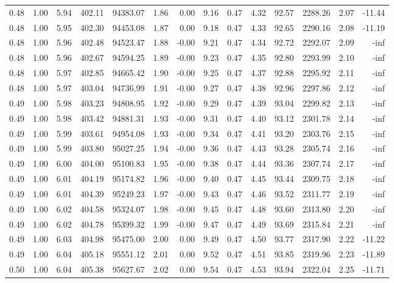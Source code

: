 \begin{table}[!ht]
\begin{tabular}{rrrrrrrrrrrrrr}
0.48 & 1.00 & 5.94 & 402.11 & 94383.07 & 1.86 & 0.00 & 9.16 & 0.47 & 4.32 & 92.57 & 2288.26 & 2.07 & -11.44 \\
0.48 & 1.00 & 5.95 & 402.30 & 94453.08 & 1.87 & 0.00 & 9.18 & 0.47 & 4.33 & 92.65 & 2290.16 & 2.08 & -11.19 \\
0.48 & 1.00 & 5.96 & 402.48 & 94523.47 & 1.88 & -0.00 & 9.21 & 0.47 & 4.34 & 92.72 & 2292.07 & 2.09 & -inf \\
0.48 & 1.00 & 5.96 & 402.67 & 94594.25 & 1.89 & -0.00 & 9.23 & 0.47 & 4.35 & 92.80 & 2293.99 & 2.10 & -inf \\
0.48 & 1.00 & 5.97 & 402.85 & 94665.42 & 1.90 & -0.00 & 9.25 & 0.47 & 4.37 & 92.88 & 2295.92 & 2.11 & -inf \\
0.48 & 1.00 & 5.97 & 403.04 & 94736.99 & 1.91 & -0.00 & 9.27 & 0.47 & 4.38 & 92.96 & 2297.86 & 2.12 & -inf \\
0.49 & 1.00 & 5.98 & 403.23 & 94808.95 & 1.92 & -0.00 & 9.29 & 0.47 & 4.39 & 93.04 & 2299.82 & 2.13 & -inf \\
0.49 & 1.00 & 5.98 & 403.42 & 94881.31 & 1.93 & -0.00 & 9.31 & 0.47 & 4.40 & 93.12 & 2301.78 & 2.14 & -inf \\
0.49 & 1.00 & 5.99 & 403.61 & 94954.08 & 1.93 & -0.00 & 9.34 & 0.47 & 4.41 & 93.20 & 2303.76 & 2.15 & -inf \\
0.49 & 1.00 & 5.99 & 403.80 & 95027.25 & 1.94 & -0.00 & 9.36 & 0.47 & 4.43 & 93.28 & 2305.74 & 2.16 & -inf \\
0.49 & 1.00 & 6.00 & 404.00 & 95100.83 & 1.95 & -0.00 & 9.38 & 0.47 & 4.44 & 93.36 & 2307.74 & 2.17 & -inf \\
0.49 & 1.00 & 6.01 & 404.19 & 95174.82 & 1.96 & -0.00 & 9.40 & 0.47 & 4.45 & 93.44 & 2309.75 & 2.18 & -inf \\
0.49 & 1.00 & 6.01 & 404.39 & 95249.23 & 1.97 & -0.00 & 9.43 & 0.47 & 4.46 & 93.52 & 2311.77 & 2.19 & -inf \\
0.49 & 1.00 & 6.02 & 404.58 & 95324.07 & 1.98 & -0.00 & 9.45 & 0.47 & 4.48 & 93.60 & 2313.80 & 2.20 & -inf \\
0.49 & 1.00 & 6.02 & 404.78 & 95399.32 & 1.99 & -0.00 & 9.47 & 0.47 & 4.49 & 93.69 & 2315.84 & 2.21 & -inf \\
0.49 & 1.00 & 6.03 & 404.98 & 95475.00 & 2.00 & 0.00 & 9.49 & 0.47 & 4.50 & 93.77 & 2317.90 & 2.22 & -11.22 \\
0.49 & 1.00 & 6.04 & 405.18 & 95551.12 & 2.01 & 0.00 & 9.52 & 0.47 & 4.51 & 93.85 & 2319.96 & 2.23 & -11.89 \\
0.50 & 1.00 & 6.04 & 405.38 & 95627.67 & 2.02 & 0.00 & 9.54 & 0.47 & 4.53 & 93.94 & 2322.04 & 2.25 & -11.71 \\

\end{tabular}
\end{table}

